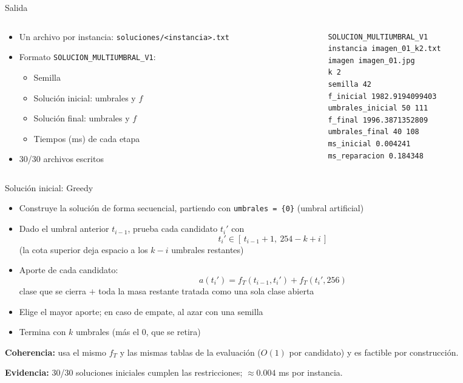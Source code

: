 \documentclass[aspectratio=169, 10pt]{beamer}
\begin{document}
\begin{frame}[fragile]{Salida}
  \begin{columns}[T]
    \begin{column}{0.5\textwidth}
      \begin{itemize}
        \item Un archivo por instancia: \texttt{soluciones/<instancia>.txt}
        \item Formato \texttt{SOLUCION\_MULTIUMBRAL\_V1}:
        \begin{itemize}
          \item Semilla
          \item Solución inicial: umbrales y $f$
          \item Solución final: umbrales y $f$
          \item Tiempos (ms) de cada etapa
        \end{itemize}
        \item 30/30 archivos escritos
      \end{itemize}
    \end{column}
    \begin{column}{0.5\textwidth}
\begin{verbatim}
SOLUCION_MULTIUMBRAL_V1
instancia imagen_01_k2.txt
imagen imagen_01.jpg
k 2
semilla 42
f_inicial 1982.9194099403
umbrales_inicial 50 111
f_final 1996.3871352809
umbrales_final 40 108
ms_inicial 0.004241
ms_reparacion 0.184348
\end{verbatim}
    \end{column}
  \end{columns}
\end{frame}

\begin{frame}{Solución inicial: Greedy}
  \begin{itemize}
    \item Construye la solución de forma secuencial, partiendo con \texttt{umbrales = \{0\}} (umbral artificial)
    \item Dado el umbral anterior $t_{i-1}$, prueba cada candidato $t_i'$ con
    \[ t_i' \in [\,t_{i-1}+1,\ 254-k+i\,] \]
    (la cota superior deja espacio a los $k-i$ umbrales restantes)
    \item Aporte de cada candidato:
    \[ a(t_i') = f_T(t_{i-1}, t_i') + f_T(t_i', 256) \]
    clase que se cierra $+$ toda la masa restante tratada como una sola clase abierta
    \item Elige el mayor aporte; en caso de empate, al azar con una semilla
    \item Termina con $k$ umbrales (más el 0, que se retira)
  \end{itemize}
  \textbf{Coherencia:} usa el mismo $f_T$ y las mismas tablas de la evaluación ($O(1)$ por candidato) y es factible por construcción.

  \textbf{Evidencia:} 30/30 soluciones iniciales cumplen las restricciones; $\approx 0.004$ ms por instancia.
\end{frame}
\end{document}
